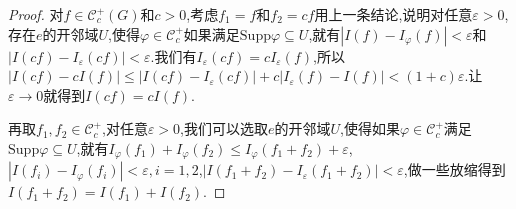 \begin{enumerate}
\begin{proof}
    	对$f\in\mathscr{C}_c^+(G)$和$c>0$,考虑$f_1=f$和$f_2=cf$用上一条结论,说明对任意$\varepsilon>0$,存在$e$的开邻域$U$,使得$\varphi\in\mathscr{C}_c^+$如果满足$\mathrm{Supp}\varphi\subseteq U$,就有$|I(f)-I_{\varphi}(f)|<\varepsilon$和$|I(cf)-I_{\varepsilon}(cf)|<\varepsilon$.我们有$I_{\varepsilon}(cf)=cI_{\varepsilon}(f)$,所以$|I(cf)-cI(f)|\le|I(cf)-I_{\varepsilon}(cf)|+c|I_{\varepsilon}(f)-I(f)|<(1+c)\varepsilon$.让$\varepsilon\to0$就得到$I(cf)=cI(f)$.
    	
    	\qquad
    	
    	再取$f_1,f_2\in\mathscr{C}_c^+$,对任意$\varepsilon>0$,我们可以选取$e$的开邻域$U$,使得如果$\varphi\in\mathscr{C}_c^+$满足$\mathrm{Supp}\varphi\subseteq U$,就有$I_{\varphi}(f_1)+I_{\varphi}(f_2)\le I_{\varphi}(f_1+f_2)+\varepsilon$,$|I(f_i)-I_{\varphi}(f_i)|<\varepsilon,i=1,2$,$|I(f_1+f_2)-I_{\varepsilon}(f_1+f_2)|<\varepsilon$,做一些放缩得到$I(f_1+f_2)=I(f_1)+I(f_2)$.
    	
    	\qquad
    	

\end{proof}
\end{enumerate}
